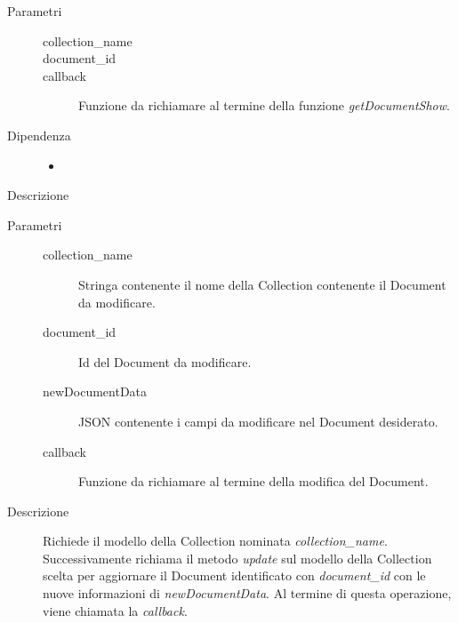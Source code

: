 \begin{description}
\begin{mldescription}
	 \hfill
		\begin{description}
			\item[Parametri] \hfill
				\begin{description}
					\item[collection\_name] \hfill
					\item[document\_id] \hfill
					\item[callback] \hfill
					Funzione da richiamare al termine della funzione \textit{getDocumentShow}.
				\end{description}
			\item[Dipendenza] \hfill
				\begin{itemize}
					\item
				\end{itemize}
			\item[Descrizione] \hfill
		\end{description}
	 \hfill
	
	
	 \hfill 
		\begin{description}
			\item[Parametri] \hfill
				\begin{description}
					\item[collection\_name] \hfill
					Stringa contenente il nome della Collection contenente il Document da modificare.
					\item[document\_id] \hfill
					Id del Document da modificare.
					\item[newDocumentData] \hfill
					JSON contenente i campi da modificare nel Document desiderato.
					
					
					\item[callback] \hfill
					Funzione da richiamare al termine della modifica del Document.
				\end{description}
			\item[Descrizione] \hfill
			Richiede il modello della Collection nominata \textit{collection\_name}. Successivamente richiama
			il metodo \textit{update} sul modello della Collection scelta per aggiornare il Document identificato 
			con \textit{document\_id} con le nuove informazioni di \textit{newDocumentData}. Al termine di questa 
			operazione, viene chiamata la \textit{callback}.
		\end{description}
	

\end{mldescription}
\end{description}
